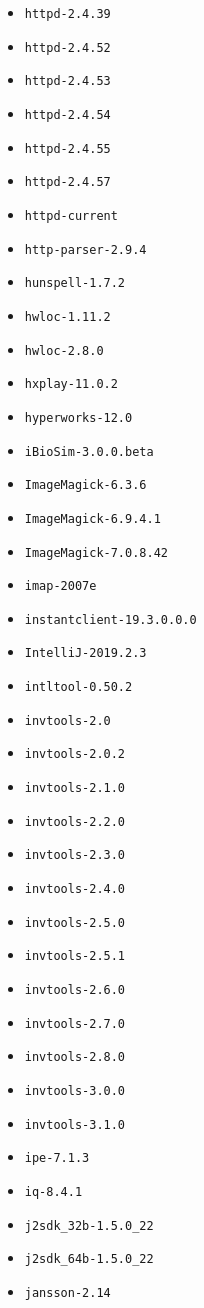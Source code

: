 \begin{itemize}
\item \verb|httpd-2.4.39|
\item \verb|httpd-2.4.52|
\item \verb|httpd-2.4.53|
\item \verb|httpd-2.4.54|
\item \verb|httpd-2.4.55|
\item \verb|httpd-2.4.57|
\item \verb|httpd-current|
\item \verb|http-parser-2.9.4|
\item \verb|hunspell-1.7.2|
\item \verb|hwloc-1.11.2|
\item \verb|hwloc-2.8.0|
\item \verb|hxplay-11.0.2|
\item \verb|hyperworks-12.0|
\item \verb|iBioSim-3.0.0.beta|
\item \verb|ImageMagick-6.3.6|
\item \verb|ImageMagick-6.9.4.1|
\item \verb|ImageMagick-7.0.8.42|
\item \verb|imap-2007e|
\item \verb|instantclient-19.3.0.0.0|
\item \verb|IntelliJ-2019.2.3|
\item \verb|intltool-0.50.2|
\item \verb|invtools-2.0|
\item \verb|invtools-2.0.2|
\item \verb|invtools-2.1.0|
\item \verb|invtools-2.2.0|
\item \verb|invtools-2.3.0|
\item \verb|invtools-2.4.0|
\item \verb|invtools-2.5.0|
\item \verb|invtools-2.5.1|
\item \verb|invtools-2.6.0|
\item \verb|invtools-2.7.0|
\item \verb|invtools-2.8.0|
\item \verb|invtools-3.0.0|
\item \verb|invtools-3.1.0|
\item \verb|ipe-7.1.3|
\item \verb|iq-8.4.1|
\item \verb|j2sdk_32b-1.5.0_22|
\item \verb|j2sdk_64b-1.5.0_22|
\item \verb|jansson-2.14|

\end{itemize}
